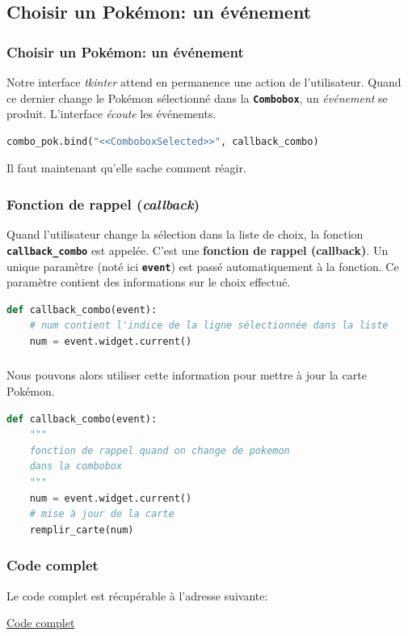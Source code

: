 \documentclass[svgnames,11pt]{beamer}
\begin{document}
\subsection{Choisir un Pokémon: un événement}
\begin{frame}[fragile]
    \frametitle{Choisir un Pokémon: un événement}

    Notre interface \emph{tkinter} attend en permanence une action de l'utilisateur. Quand ce dernier change le Pokémon sélectionné dans la \textbf{\texttt{Combobox}}, un \emph{événement} se produit. L'interface \emph{écoute} les événements.

    \begin{center}
    \begin{lstlisting}[language=Python,basicstyle=\small,xleftmargin=0.3em,xrightmargin=0.3em]
combo_pok.bind("<<ComboboxSelected>>", callback_combo)
\end{lstlisting}
    \label{CODE}
    \end{center}
Il faut maintenant qu'elle sache comment réagir.
\end{frame}
\begin{frame}[fragile]
    \frametitle{Fonction de rappel (\emph{callback})}

Quand l'utilisateur change la sélection dans la liste de choix, la fonction \textbf{\texttt{callback\_combo}} est appelée. C'est une \textbf{fonction de rappel (callback)}. Un unique paramètre (noté ici \textbf{\texttt{event}}) est passé automatiquement à la fonction. Ce paramètre contient des informations sur le choix effectué.
\begin{center}
\begin{lstlisting}[language=Python,basicstyle=\small]
def callback_combo(event):
    # num contient l'indice de la ligne sélectionnée dans la liste
    num = event.widget.current()
\end{lstlisting}
\label{CODE}
\end{center}
\end{frame}
\begin{frame}[fragile]
    \frametitle{}

Nous pouvons alors utiliser cette information pour mettre à jour la carte Pokémon.

\begin{center}
\begin{lstlisting}[language=Python, basicstyle=\small]
def callback_combo(event):
    """
    fonction de rappel quand on change de pokemon
    dans la combobox
    """
    num = event.widget.current()
    # mise à jour de la carte
    remplir_carte(num)
\end{lstlisting}
\end{center}

\end{frame}
\begin{frame}
    \frametitle{Code complet}

    Le code complet est récupérable à l'adresse suivante:
    \begin{center}
        \href{https://cviroulaud.github.io/premiere/donnees-table/pokemon/scripts/pokemon-correction.zip}{Code complet}
    \end{center}

\end{frame}
\end{document}
